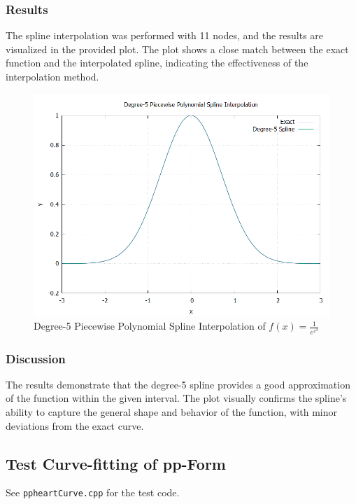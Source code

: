 \documentclass{article}
\begin{document}
\subsubsection{Results}
The spline interpolation was performed with 11 nodes, and the results are visualized in the provided plot. The plot shows a close match between the exact function and the interpolated spline, indicating the effectiveness of the interpolation method.

\begin{figure}[H]
    \centering
    \includegraphics[width=\textwidth]{../figure/degree5_spline_plot.png}
    \caption{Degree-5 Piecewise Polynomial Spline Interpolation of \( f(x) = \frac{1}{e^{x^2}} \)}
    \label{fig:degree5_spline}
\end{figure}

\subsubsection{Discussion}
The results demonstrate that the degree-5 spline provides a good approximation of the function within the given interval. The plot visually confirms the spline's ability to capture the general shape and behavior of the function, with minor deviations from the exact curve.

\subsection{Test Curve-fitting of pp-Form}
See \texttt{ppheartCurve.cpp} for the test code.
\end{document}
